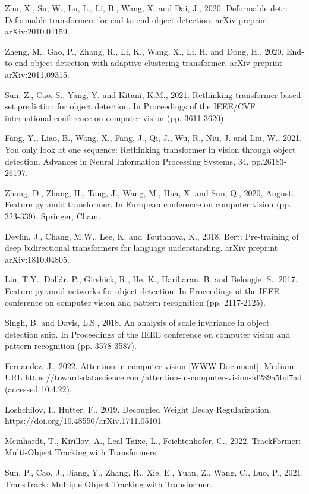 \begin{thebibliography}{ widest-label }
	Zhu, X., Su, W., Lu, L., Li, B., Wang, X. and Dai, J., 2020. Deformable detr: Deformable transformers for end-to-end object detection. arXiv preprint arXiv:2010.04159.
	
	Zheng, M., Gao, P., Zhang, R., Li, K., Wang, X., Li, H. and Dong, H., 2020. End-to-end object detection with adaptive clustering transformer. arXiv preprint arXiv:2011.09315.
	
	Sun, Z., Cao, S., Yang, Y. and Kitani, K.M., 2021. Rethinking transformer-based set prediction for object detection. In Proceedings of the IEEE/CVF international conference on computer vision (pp. 3611-3620).
	
	Fang, Y., Liao, B., Wang, X., Fang, J., Qi, J., Wu, R., Niu, J. and Liu, W., 2021. You only look at one sequence: Rethinking transformer in vision through object detection. Advances in Neural Information Processing Systems, 34, pp.26183-26197.
	
	Zhang, D., Zhang, H., Tang, J., Wang, M., Hua, X. and Sun, Q., 2020, August. Feature pyramid transformer. In European conference on computer vision (pp. 323-339). Springer, Cham.
	
	Devlin, J., Chang, M.W., Lee, K. and Toutanova, K., 2018. Bert: Pre-training of deep bidirectional transformers for language understanding. arXiv preprint arXiv:1810.04805.
	
	Lin, T.Y., Dollár, P., Girshick, R., He, K., Hariharan, B. and Belongie, S., 2017. Feature pyramid networks for object detection. In Proceedings of the IEEE conference on computer vision and pattern recognition (pp. 2117-2125).
	
	Singh, B. and Davis, L.S., 2018. An analysis of scale invariance in object detection snip. In Proceedings of the IEEE conference on computer vision and pattern recognition (pp. 3578-3587).
	
	Fernandez, J., 2022. Attention in computer vision [WWW Document]. Medium. URL https://towardsdatascience.com/attention-in-computer-vision-fd289a5bd7ad (accessed 10.4.22).
	
	Loshchilov, I., Hutter, F., 2019. Decoupled Weight Decay Regularization. https://doi.org/10.48550/arXiv.1711.05101
	
	Meinhardt, T., Kirillov, A., Leal-Taixe, L., Feichtenhofer, C., 2022. TrackFormer: Multi-Object Tracking with Transformers.
	
	Sun, P., Cao, J., Jiang, Y., Zhang, R., Xie, E., Yuan, Z., Wang, C., Luo, P., 2021. TransTrack: Multiple Object Tracking with Transformer.
\end{thebibliography}
